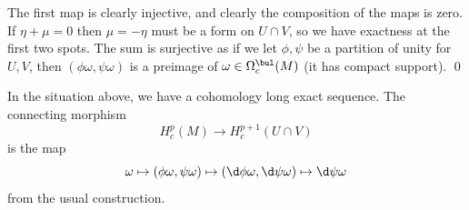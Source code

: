 \ethrm

\bproof

    The first map is clearly injective, and clearly the composition of the maps is zero.
    If $\eta+\mu=0$ then $\mu=-\eta$ must be a form on $U\cap V$, so we have exactness at the first two spots.
    The sum is surjective as if we let $\phi,\psi$ be a partition of unity for $U,V$, then $(\phi\omega,\psi\omega)$
    is a preimage of $\omega\in\Omega^\bul_c(M)$ (it has compact support).
    \qed

\eproof

In the situation above, we have a cohomology long exact sequence.
The connecting morphism
$$ H_c^p(M) \to H_c^{p+1}(U\cap V) $$
is the map
$$ \omega \mapsto (\phi\omega,\psi\omega) \mapsto (\d\phi\omega,\d\psi\omega) \mapsto \d\psi\omega $$
from the usual construction.

